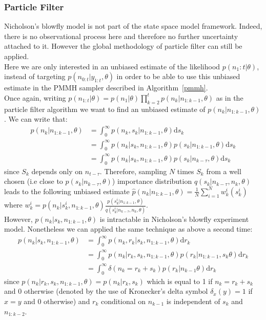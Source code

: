 \documentclass[12pt]{article}
\begin{document}
	\subsubsection{Particle Filter}
	Nicholson's blowfly model is not part of the state space model framework. Indeed, there is no observational process here and therefore no further uncertainty attached to it. However the global methodology of particle filter can still be applied. \\
	Here we are only interested in an unbiased estimate of the likelihood $p(n_1:t|\theta)$, instead of targeting $p(n_{0:t}|y_{1:t}, \theta)$ in order to be able to use this unbiased estimate in the PMMH sampler described in Algorithm~\ref{pmmh}. \\
	Once again, writing $p(n_{1:t}|\theta) = p(n_1|\theta)\prod_{k=2}^{t}p(n_k|n_{1:k-1}, \theta)$ as in the particle filter algorithm we want to find an unbiased estimate of $p(n_k|n_{1:k-1}, \theta)$. We can write that:
	\begin{align*}
	p(n_k|n_{1:k-1}, \theta) & = \int_{0}^{\infty}p(n_k, s_k |n_{1:k-1}, \theta)\mathrm{d}s_k \\
	& = \int_{0}^{\infty}p(n_k |s_k, n_{1:k-1}, \theta)p(s_k|n_{1:k-1}, \theta)\mathrm{d}s_k \\
	& = \int_{0}^{\infty}p(n_k |s_k, n_{1:k-1}, \theta)p(s_k|n_{k-\tau}, \theta)\mathrm{d}s_k
	\end{align*}
	since $S_k$ depends only on $n_{t-\tau}$.
	Therefore, sampling $N$ times $S_k$ from a well chosen (i.e close to $p(s_k|n_{k-\tau}, \theta)$) importance distribution $q(s_k|n_{k-\tau}, n_k, \theta)$ leads to the following unbiased estimate $\hat{p}(n_k|n_{1:k-1}, \theta) = \frac{1}{N}\sum_{i=1}^{N}w_k^i(s_k^i)$ where $w_k^i =p(n_k |s_k^i, n_{1:k-1}, \theta)\frac{p(s_k^i|n_{1:k-1}, \theta)}{q(s_k^i|n_{k-\tau}, n_k, \theta)}$. \\
	However, $p(n_k |s_k, n_{1:k-1}, \theta)$ is intractable in Nicholson's blowfly experiment model. Nonetheless we can applied the same technique as above a second time:
	\begin{align*}
	p(n_k |s_k, n_{1:k-1}, \theta) & = \int_{0}^{\infty}p(n_k, r_k|s_k, n_{1:k-1}, \theta)\mathrm{d}r_k \\
	& = \int_{0}^{\infty}p(n_k| r_k, s_k, n_{1:k-1}, \theta)p( r_k|n_{1:k-1}, s_k \theta)\mathrm{d}r_k \\
	& = \int_{0}^{\infty}\delta(n_k = r_k + s_k)p(r_k|n_{k-1} \theta)\mathrm{d}r_k
	\end{align*}
	since $p(n_k| r_k, s_k, n_{1:k-1}, \theta)=p(n_k| r_k, s_k)$ which is equal to 1 if $n_k = r_k + s_k$ and 0 otherwise (denoted by the use of Kronecker's delta symbol $\delta_x(y) = 1$ if $x=y$ and 0 otherwise) and $r_k$ conditional on $n_{k-1}$ is independent of $s_k$ and $n_{1:k-2}$. \\
\end{document}
